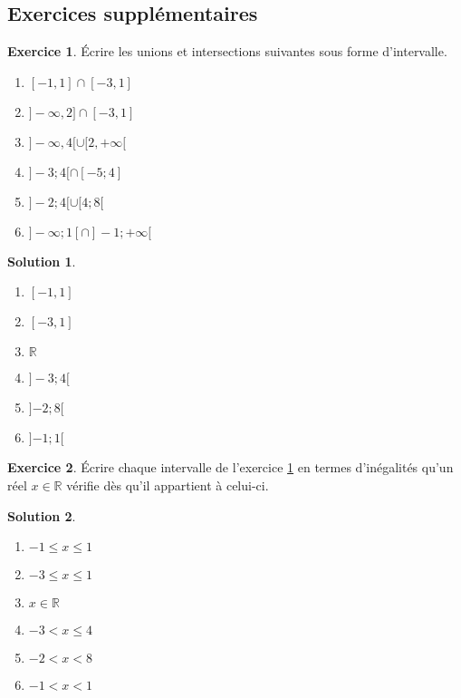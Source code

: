 \documentclass[a4paper, 14pt]{extarticle}
\theoremstyle{plain}
\newtheorem*{sol}{Solution}
\theoremstyle{definition}
\newtheorem{ex}{Exercice}
\newcommand{\R}{\mathbb{R}}
\newif\ifsolutions
\newcommand{\exe}[2]{
		\begin{ex} #1  \end{ex}
		\begin{sol} #2 \end{sol}
	}
\newcommand{\exe}[2]{
		\begin{ex} #1  \end{ex}
	}
\begin{document}
\ifsolutions
\else
\newpage
\fi

\subsection*{Exercices supplémentaires}

\exe{\label{ex:2}
	Écrire les unions et intersections suivantes sous forme d'intervalle.
	
	
	\begin{multicols}{2}
	\begin{enumerate}
		\item $[-1,1] \cap [-3, 1]$
		\item $]{-}\infty, 2] \cap [-3, 1]$
		\item $]{-}\infty, 4 [ \cup [2, +\infty[$
		\item $] {-}3 ; 4 [ \cap [-5 ; 4]$
		\item $]{-}2 ; 4 [  \cup [4 ; 8[$
		\item $ ]{-}\infty ; 1 [ \cap ]{-}1 ; +\infty [$
	\end{enumerate}
	\end{multicols}
}
{

	\begin{multicols}{2}
	\begin{enumerate}
		\item $[-1,1]$
		\item $[-3, 1]$
		\item $\R$
		\item $]{-}3 ; 4[$
		\item $]{-2} ; 8[$
		\item $]{-1};1[$
	\end{enumerate}
	\end{multicols}


}


\exe{
	Écrire chaque intervalle de l'exercice \ref{ex:2} en termes d'inégalités qu'un réel $x \in \R$ vérifie dès qu'il appartient à celui-ci.
}
{
	\begin{multicols}{2}
	\begin{enumerate}
		\item $-1 \leq x \leq 1$
		\item $-3 \leq x \leq 1$
		\item $x \in \R$
		\item $-3 < x \leq 4$
		\item $-2 < x < 8$
		\item $-1 < x < 1$
	\end{enumerate}
	\end{multicols}
}
\end{document}
